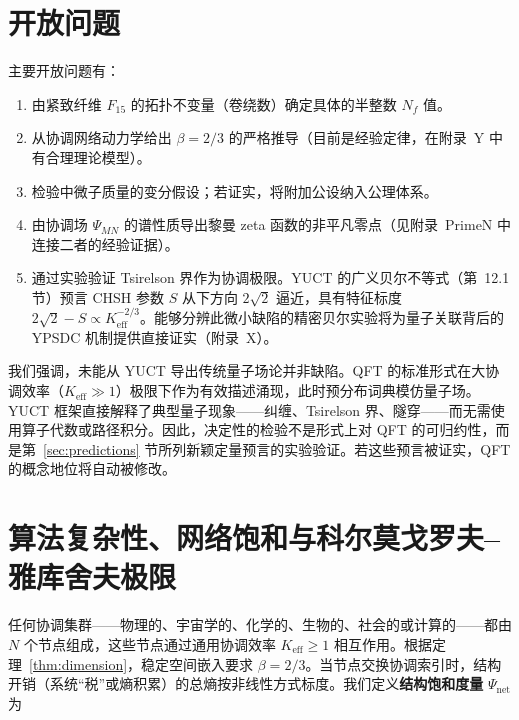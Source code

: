 \documentclass[12pt,a4paper]{article}
\theoremstyle{remark}
\newcommand{\Keff}{K_{\mathrm{eff}}}
\begin{document}
	\section{开放问题}
	\label{sec:open}
	
	主要开放问题有：
	
	\begin{enumerate}[label=(\roman*)]
		\item 由紧致纤维 \(F_{15}\) 的拓扑不变量（卷绕数）确定具体的半整数 \(N_f\) 值。
		\item 从协调网络动力学给出 \(\beta = 2/3\) 的严格推导（目前是经验定律，在附录~Y 中有合理理论模型）。
		\item 检验中微子质量的变分假设；若证实，将附加公设纳入公理体系。
		\item 由协调场 \(\Psi_{MN}\) 的谱性质导出黎曼 zeta 函数的非平凡零点（见附录~PrimeN 中连接二者的经验证据）。
		\item 通过实验验证 Tsirelson 界作为协调极限。YUCT 的广义贝尔不等式（第~12.1 节）预言 CHSH 参数 \(S\) 从下方向 \(2\sqrt{2}\) 逼近，具有特征标度 \(2\sqrt{2} - S \propto K_{\mathrm{eff}}^{-2/3}\)。能够分辨此微小缺陷的精密贝尔实验将为量子关联背后的 YPSDC 机制提供直接证实（附录~X）。
	\end{enumerate}
	
	我们强调，未能从 YUCT 导出传统量子场论并非缺陷。QFT 的标准形式在大协调效率（\(K_{\mathrm{eff}} \gg 1\)）极限下作为有效描述涌现，此时预分布词典模仿量子场。YUCT 框架直接解释了典型量子现象——纠缠、Tsirelson 界、隧穿——而无需使用算子代数或路径积分。因此，决定性的检验不是形式上对 QFT 的可归约性，而是第~\ref{sec:predictions} 节所列新颖定量预言的实验验证。若这些预言被证实，QFT 的概念地位将自动被修改。
	
	\sloppy
	\section{算法复杂性、网络饱和与科尔莫戈罗夫–雅库舍夫极限}
	\label{sec:complexity}
	
	任何协调集群——物理的、宇宙学的、化学的、生物的、社会的或计算的——都由 \(N\) 个节点组成，这些节点通过通用协调效率 \(\Keff \ge 1\) 相互作用。根据定理~\ref{thm:dimension}，稳定空间嵌入要求 \(\beta = 2/3\)。当节点交换协调索引时，结构开销（系统“税”或熵积累）的总熵按非线性方式标度。我们定义\textbf{结构饱和度量} \(\Psi_{\mathrm{net}}\) 为
	
\end{document}
